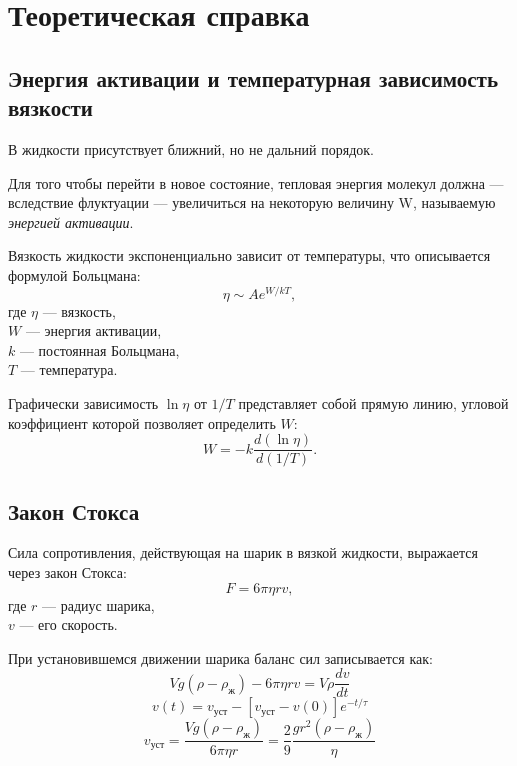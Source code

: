 \documentclass[a4paper,12pt]{article} %
\begin{document}
\section*{Теоретическая справка}

\medskip 

\subsection*{Энергия активации и температурная зависимость вязкости}
В жидкости присутствует ближний, но не дальний порядок.

Для того чтобы перейти в новое состояние, тепловая энергия молекул должна — вследствие флуктуации — увеличиться на некоторую величину W, называемую \textit{энергией активации}.

\medskip

Вязкость жидкости экспоненциально зависит от температуры, что описывается формулой Больцмана:
\begin{equation}
    \eta \sim A e^{W/kT},
\end{equation}
где $\eta$ — вязкость, \\
$W$ — энергия активации, \\
$k$ — постоянная Больцмана, \\
$T$ — температура.

Графически зависимость $\ln \eta$ от $1/T$ представляет собой прямую линию, угловой коэффициент которой позволяет определить $W$:
\begin{equation}
    W = -k \frac{d(\ln \eta)}{d(1/T)}.
\end{equation}

\subsection*{Закон Стокса}
Сила сопротивления, действующая на шарик в вязкой жидкости, выражается через закон Стокса:
\begin{equation}
    F = 6\pi \eta r v,
\end{equation}
где $r$ — радиус шарика, \\
$v$ — его скорость.

При установившемся движении шарика баланс сил записывается как:
\begin{equation}
    V g(\rho - \rho_\text{ж}) - 6 \pi \eta r v = V \rho \frac{d v}{d t}
\end{equation}
\begin{equation}
	v(t) = v_\text{уст} - [v_\text{уст} - v(0)]e^{-t/\tau}
\end{equation}
\begin{equation}
	v_{уст} = \frac{Vg (\rho - \rho_\text{ж})}{6 \pi \eta r} = \frac{2}{9} \frac{g r^2 (\rho - \rho_\text{ж})}{\eta}
\end{equation}
\end{document}
